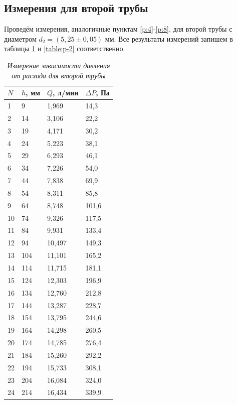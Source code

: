 \documentclass[a4paper,12pt]{article}
\begin{document}
\subsection{Измерения для второй трубы}

Проведём измерения, аналогичные пунктам \ref{p:4}-\ref{p:8}, для второй трубы с диаметром $d_2 = (5,25 \pm 0,05)$ мм. Все результаты измерений запишем в таблицы \ref{table:q-2} и \ref{table:p-2} соответственно.

\begin{table}[!ht]
    \centering
    \begin{tabular}{|l|l|l|l|}
    \hline
        $N$ & $h$, мм & $Q$, л/мин & $\Delta P$, Па  \\ \hline
        1 & 9 & 1,969 & 14,3 \\ \hline
        2 & 14 & 3,106 & 22,2 \\ \hline
        3 & 19 & 4,171 & 30,2 \\ \hline
        4 & 24 & 5,223 & 38,1 \\ \hline
        5 & 29 & 6,293 & 46,1 \\ \hline
        6 & 34 & 7,226 & 54,0 \\ \hline
        7 & 44 & 7,838 & 69,9 \\ \hline
        8 & 54 & 8,311 & 85,8 \\ \hline
        9 & 64 & 8,748 & 101,6 \\ \hline
        10 & 74 & 9,326 & 117,5 \\ \hline
        11 & 84 & 9,931 & 133,4 \\ \hline
        12 & 94 & 10,497 & 149,3 \\ \hline
        13 & 104 & 11,101 & 165,2 \\ \hline
        14 & 114 & 11,715 & 181,1 \\ \hline
        15 & 124 & 12,303 & 196,9 \\ \hline
        16 & 134 & 12,760 & 212,8 \\ \hline
        17 & 144 & 13,287 & 228,7 \\ \hline
        18 & 154 & 13,795 & 244,6 \\ \hline
        19 & 164 & 14,298 & 260,5 \\ \hline
        20 & 174 & 14,785 & 276,4 \\ \hline
        21 & 184 & 15,260 & 292,2 \\ \hline
        22 & 194 & 15,733 & 308,1 \\ \hline
        23 & 204 & 16,084 & 324,0 \\ \hline
        24 & 214 & 16,434 & 339,9 \\ \hline
    \end{tabular}\caption{\textit{Измерение зависимости давления от расхода для второй трубы}}\label{table:q-2}
\end{table}
\end{document}

